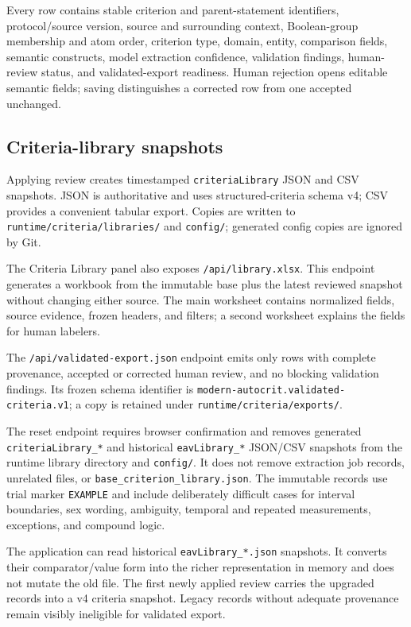 \documentclass[11pt]{article}
\newcommand{\code}[1]{\nolinkurl{#1}}
\begin{document}
Every row contains stable criterion and parent-statement identifiers, protocol/source version, source and surrounding context, Boolean-group membership and atom order, criterion type, domain, entity, comparison fields, semantic constructs, model extraction confidence, validation findings, human-review status, and validated-export readiness. Human rejection opens editable semantic fields; saving distinguishes a corrected row from one accepted unchanged.

\subsection{Criteria-library snapshots}

Applying review creates timestamped \code{criteriaLibrary} JSON and CSV snapshots. JSON is authoritative and uses structured-criteria schema v4; CSV provides a convenient tabular export. Copies are written to \code{runtime/criteria/libraries/} and \code{config/}; generated config copies are ignored by Git.

The Criteria Library panel also exposes \code{/api/library.xlsx}. This endpoint generates a workbook from the immutable base plus the latest reviewed snapshot without changing either source. The main worksheet contains normalized fields, source evidence, frozen headers, and filters; a second worksheet explains the fields for human labelers.

The \code{/api/validated-export.json} endpoint emits only rows with complete provenance, accepted or corrected human review, and no blocking validation findings. Its frozen schema identifier is \code{modern-autocrit.validated-criteria.v1}; a copy is retained under \code{runtime/criteria/exports/}.

The reset endpoint requires browser confirmation and removes generated \code{criteriaLibrary_*} and historical \code{eavLibrary_*} JSON/CSV snapshots from the runtime library directory and \code{config/}. It does not remove extraction job records, unrelated files, or \code{base_criterion_library.json}. The immutable records use trial marker \code{EXAMPLE} and include deliberately difficult cases for interval boundaries, sex wording, ambiguity, temporal and repeated measurements, exceptions, and compound logic.

The application can read historical \code{eavLibrary_*.json} snapshots. It converts their comparator/value form into the richer representation in memory and does not mutate the old file. The first newly applied review carries the upgraded records into a v4 criteria snapshot. Legacy records without adequate provenance remain visibly ineligible for validated export.
\end{document}
